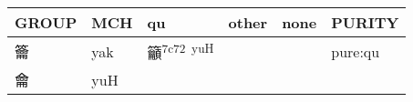 \documentclass[14pt,a4paper]{scrartcl}
\begin{document}
\begin{longtable}[c]{@{}llllll@{}}
\toprule
\begin{minipage}[b]{0.14\columnwidth}\raggedright\strut
GROUP
\strut\end{minipage} &
\begin{minipage}[b]{0.14\columnwidth}\raggedright\strut
MCH
\strut\end{minipage} &
\begin{minipage}[b]{0.14\columnwidth}\raggedright\strut
qu
\strut\end{minipage} &
\begin{minipage}[b]{0.14\columnwidth}\raggedright\strut
other
\strut\end{minipage} &
\begin{minipage}[b]{0.14\columnwidth}\raggedright\strut
none
\strut\end{minipage} &
\begin{minipage}[b]{0.14\columnwidth}\raggedright\strut
PURITY
\strut\end{minipage}\tabularnewline
\midrule
\endhead
\begin{minipage}[t]{0.14\columnwidth}\raggedright\strut
籥
\strut\end{minipage} &
\begin{minipage}[t]{0.14\columnwidth}\raggedright\strut
yak
\strut\end{minipage} &
\begin{minipage}[t]{0.14\columnwidth}\raggedright\strut
籲\textsuperscript{7c72~yuH}
\strut\end{minipage} &
\begin{minipage}[t]{0.14\columnwidth}\raggedright\strut
\strut\end{minipage} &
\begin{minipage}[t]{0.14\columnwidth}\raggedright\strut
\strut\end{minipage} &
\begin{minipage}[t]{0.14\columnwidth}\raggedright\strut
pure:qu
\strut\end{minipage}\tabularnewline
\begin{minipage}[t]{0.14\columnwidth}\raggedright\strut
龠
\strut\end{minipage} &
\begin{minipage}[t]{0.14\columnwidth}\raggedright\strut
yuH
\strut\end{minipage} &
\begin{minipage}[t]{0.14\columnwidth}\raggedright\strut
\strut\end{minipage} &
\begin{minipage}[t]{0.14\columnwidth}\raggedright\strut

\end{minipage}
\end{longtable}
\end{document}
